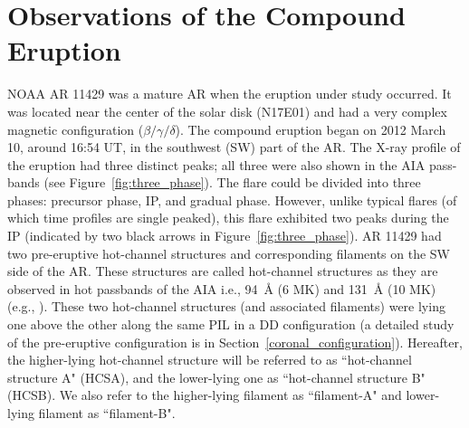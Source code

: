 \documentclass{aastex62}
\begin{document}
\section{\textbf{Observations of the Compound Eruption}}
\label{eruption}
NOAA AR 11429 was a mature AR when the eruption under study occurred. It was located near the center of the solar disk (N17E01) and had a very complex magnetic configuration ($\beta/\gamma/\delta$). The compound eruption began on 2012 March 10, around 16:54 UT, in the southwest (SW) part of the AR. The X-ray profile of the eruption had three distinct peaks; all three were also shown in the AIA pass-bands (see Figure~\ref{fig:three_phase}). The flare could be divided into three phases: precursor phase, IP, and gradual phase. However, unlike typical flares (of which time profiles are single peaked), this flare exhibited two peaks during the IP (indicated by two black arrows in Figure~\ref{fig:three_phase}). AR 11429 had two pre-eruptive hot-channel structures and corresponding filaments on the SW side of the AR. These structures are called hot-channel structures as they are observed in hot passbands of the AIA i.e., 94~\AA{} (6 MK) and 131~\AA{} (10 MK) (e.g., \citealt{Zhang_etal_2012}). These two hot-channel structures (and associated filaments) were lying one above the other along the same PIL in a DD configuration (a detailed study of the  pre-eruptive configuration is in Section~\ref{coronal_configuration}).
Hereafter, the higher-lying hot-channel structure will be referred to as ``hot-channel structure A" (HCSA), and the lower-lying one as ``hot-channel structure B" (HCSB). We also refer to the higher-lying filament as ``filament-A" and lower-lying filament as ``filament-B".
\end{document}
